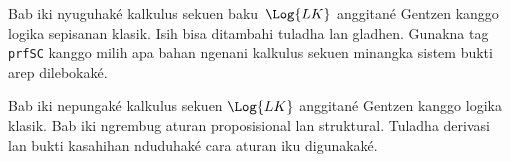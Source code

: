 \documentclass[../../../include/open-logic-chapter]{subfiles}
\begin{document}
      {}
      {}

\begin{editorial}
Bab iki nyuguhaké kalkulus sekuen baku~$\Log{LK}$ anggitané Gentzen
kanggo logika sepisanan klasik. Isih bisa ditambahi tuladha lan
gladhen. Gunakna tag \texttt{prfSC} kanggo milih apa bahan ngenani
kalkulus sekuen minangka sistem bukti arep dilebokaké.
\end{editorial}

Bab iki nepungaké kalkulus sekuen $\Log{LK}$ anggitané Gentzen
kanggo logika klasik. Bab iki ngrembug aturan proposisional lan
struktural.
Tuladha derivasi lan bukti kasahihan nduduhaké cara aturan iku digunakaké.














\OLEndChapterHook
\end{document}
